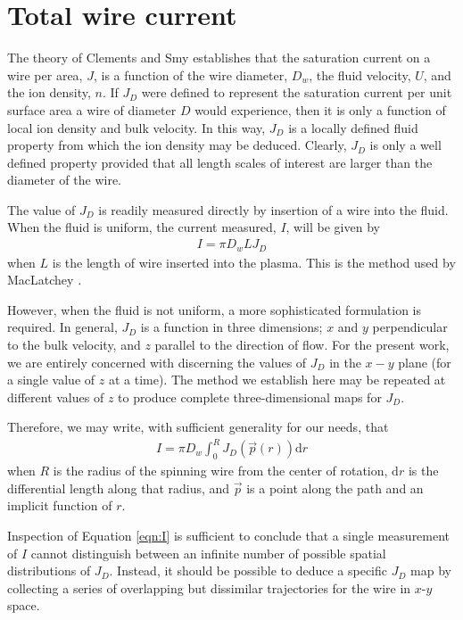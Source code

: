 \section{Total wire current}\label{sec:current}

The theory of Clements and Smy establishes that the saturation current on a wire per area, $J$, is a function of the wire diameter, $D_w$, the fluid velocity, $U$, and the ion density, $n$.  If $J_D$ were defined to represent the saturation current per unit surface area a wire of diameter $D$ would experience, then it is only a function of local ion density and bulk velocity.  In this way, $J_D$ is a locally defined fluid property from which the ion density may be deduced.  Clearly, $J_D$ is only a well defined property provided that all length scales of interest are larger than the diameter of the wire.

The value of $J_D$ is readily measured directly by insertion of a wire into the fluid.  When the fluid is uniform, the current measured, $I$, will be given by
\begin{align}
I = \pi D_w L J_D\nonumber
\end{align}
when $L$ is the length of wire inserted into the plasma.  This is the method used by MacLatchey \cite{}.

However, when the fluid is not uniform, a more sophisticated formulation is required.  In general, $J_D$ is a function in three dimensions; $x$ and $y$ perpendicular to the bulk velocity, and $z$ parallel to the direction of flow.  For the present work, we are entirely concerned with discerning the values of $J_D$ in the $x-y$ plane (for a single value of $z$ at a time).  The method we establish here may be repeated at different values of $z$ to produce complete three-dimensional maps for $J_D$.

Therefore, we may write, with sufficient generality for our needs, that
\begin{align}
I = \pi D_w \int_0^R J_D(\vec{p}(r)) \mathrm{d} r\label{eqn:I}
\end{align}
when $R$ is the radius of the spinning wire from the center of rotation, $\mathrm{d}r$ is the differential length along that radius, and $\vec{p}$ is a point along the path and an implicit function of $r$.  

Inspection of Equation \ref{eqn:I} is sufficient to conclude that a single measurement of $I$ cannot distinguish between an infinite number of possible spatial distributions of $J_D$.  Instead, it should be possible to deduce a specific $J_D$ map by collecting a series of overlapping but dissimilar trajectories for the wire in $x$-$y$ space.

